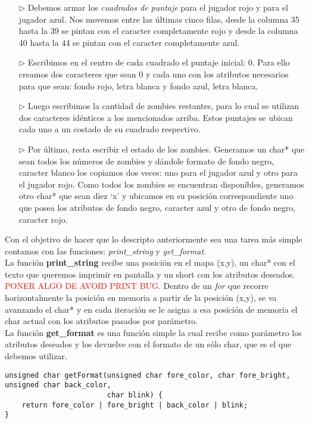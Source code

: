 \documentclass[a4paper]{article}
\begin{document}
\begin{itemize}
\item[$\triangleright$] Debemos armar los \emph{cuadrados de puntaje} para el jugador rojo y para el jugador azul. Nos movemos entre las \'ultimas cinco filas, desde la columna 35 hasta la 39 se pintan con el caracter completamente rojo y desde la columna 40 hasta la 44 se pintan con el caracter completamente azul.
\item[$\triangleright$] Escribimos en el centro de cada cuadrado el puntaje inicial: 0. Para ello creamos dos caracteres que sean 0 y cada uno con los atributos necesarios para que sean: fondo rojo, letra blanca y fondo azul, letra blanca.
\item[$\triangleright$] Luego escribimos la cantidad de zombies restantes, para lo cual se utilizan dos caracteres id\'enticos a los mencionados arriba. Estos puntajes se ubican cada uno a un costado de su cuadrado respectivo.
\item[$\triangleright$] Por \'ultimo, resta escribir el estado de los zombies. Generamos un char* que sean todos los n\'umeros de zombies y d\'andole formato de fondo negro, caracter blanco los copiamos dos veces: uno para el jugador azul y otro para el jugador rojo. Como todos los zombies se encuentran disponibles, generamos otro char* que sean diez `x' y ubicamos en su posici\'on correspondiente uno que posea los atributos de fondo negro, caracter azul y otro de fondo negro, caracter rojo.
\end{itemize}

Con el objetivo de hacer que lo descripto anteriormente sea una tarea m\'as simple contamos con las funciones: \emph{print_string} y \emph{get_format}.\\

La funci\'on \textbf{print_string} recibe una posici\'on en el mapa (x,y), un char* con el texto que queremos imprimir en pantalla y un short con los atributos deseados. \textcolor{red}{PONER ALGO DE AVOID PRINT BUG}. Dentro de un \textit{for} que recorre horizontalmente la posici\'on en memoria a partir de la posici\'on (x,y), se va avanzando el char* y en cada iteraci\'on se le asigna a esa posici\'on de memoria el char actual con los atributos pasados por par\'ametro.\\

La funci\'on \textbf{get_format} es una funci\'on simple la cual recibe como par\'ametro los atributos deseados y los devuelve con el formato de un s\'olo char, que es el que debemos utilizar.
\begin{codesnippet}
\begin{verbatim}
unsigned char getFormat(unsigned char fore_color, char fore_bright, unsigned char back_color, 
                        char blink) {
    return fore_color | fore_bright | back_color | blink; 
}
\end{verbatim}
\end{codesnippet}
\end{document}
